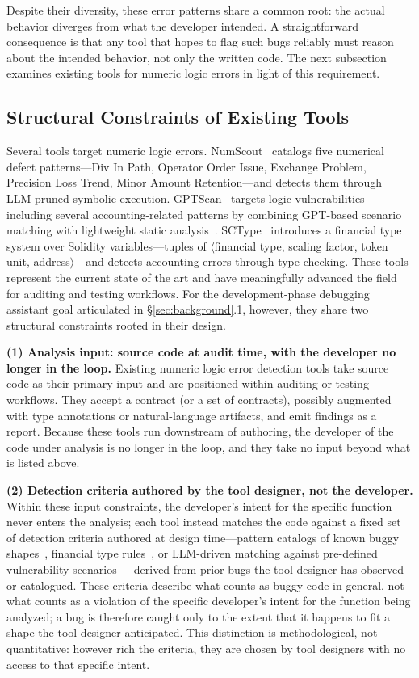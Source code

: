 \documentclass[pdflatex,sn-basic]{sn-jnl}%
\theoremstyle{thmstyleone}%
\theoremstyle{thmstyletwo}%
\theoremstyle{thmstylethree}%
\begin{document}
Despite their diversity, these error patterns share a common root: the actual behavior diverges from what the developer intended.
A straightforward consequence is that any tool that hopes to flag such bugs reliably must reason about the intended behavior, not only the written code.
The next subsection examines existing tools for numeric logic errors in light of this requirement.

\subsection{Structural Constraints of Existing Tools}

Several tools target numeric logic errors.
NumScout~\citep{numscout} catalogs five numerical defect patterns---Div In Path, Operator Order Issue, Exchange Problem, Precision Loss Trend, Minor Amount Retention---and detects them through LLM-pruned symbolic execution.
GPTScan~\citep{gptscan} targets logic vulnerabilities including several accounting-related patterns by combining GPT-based scenario matching with lightweight static analysis~\citep{slither}.
SCType~\citep{accountingerrors} introduces a financial type system over Solidity variables---tuples of $\langle$financial type, scaling factor, token unit, address$\rangle$---and detects accounting errors through type checking.
These tools represent the current state of the art and have meaningfully advanced the field for auditing and testing workflows.
For the development-phase debugging assistant goal articulated in §\ref{sec:background}.1, however, they share two structural constraints rooted in their design.

\smallskip
\noindent\textbf{(1) Analysis input: source code at audit time, with the developer no longer in the loop.}
Existing numeric logic error detection tools take source code as their primary input and are positioned within auditing or testing workflows.
They accept a contract (or a set of contracts), possibly augmented with type annotations or natural-language artifacts, and emit findings as a report.
Because these tools run downstream of authoring, the developer of the code under analysis is no longer in the loop, and they take no input beyond what is listed above.

\smallskip
\noindent\textbf{(2) Detection criteria authored by the tool designer, not the developer.}
Within these input constraints, the developer's intent for the specific function never enters the analysis; each tool instead matches the code against a fixed set of detection criteria authored at design time---pattern catalogs of known buggy shapes~\citep{numscout}, financial type rules~\citep{accountingerrors}, or LLM-driven matching against pre-defined vulnerability scenarios~\citep{gptscan}---derived from prior bugs the tool designer has observed or catalogued.
These criteria describe what counts as buggy code in general, not what counts as a violation of the specific developer's intent for the function being analyzed; a bug is therefore caught only to the extent that it happens to fit a shape the tool designer anticipated.
This distinction is methodological, not quantitative: however rich the criteria, they are chosen by tool designers with no access to that specific intent.
\end{document}
